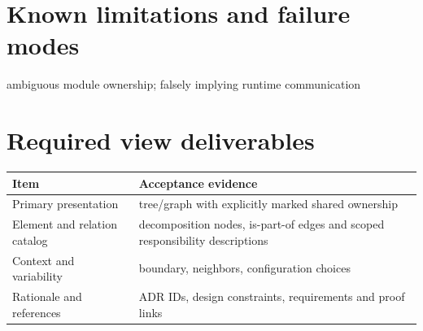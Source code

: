 \documentclass[10pt,letterpaper]{article}
\begin{document}
\section{Known limitations and failure modes}
ambiguous module ownership; falsely implying runtime communication

\section{Required view deliverables}
\small
\begin{tabularx}{\linewidth}{@{}YY@{}}
\toprule
\textbf{Item} & \textbf{Acceptance evidence} \\
\midrule
Primary presentation & tree/graph with explicitly marked shared ownership \\
Element and relation catalog & decomposition nodes, is-part-of edges and scoped responsibility descriptions \\
Context and variability & boundary, neighbors, configuration choices \\
Rationale and references & ADR IDs, design constraints, requirements and proof links \\
\bottomrule
\end{tabularx}
\normalsize
\end{document}
